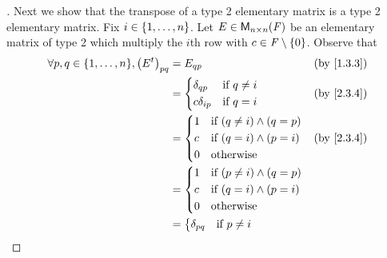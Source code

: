 \begin{proof}[]
  Next we show that the transpose of a type 2 elementary matrix is a type 2 elementary matrix.
  Fix \(i \in \left\lbrace1, \dots, n\right\rbrace\).
  Let \(E \in \mathsf{M}_{{n} \times n}({\mathit{F}})\) be an elementary matrix of type 2 which multiply the \(i\)th row with \(c \in \mathit{F} \setminus \left\lbrace0\right\rbrace\).
  Observe that
  \begin{align*}
    \forall p, q \in \set{1, \dots, n}, \pa{\tp{E}}_{p q} & = E_{q p}                                  &  & \text{(by \cref{1.3.3})} \\
                                                          & = \begin{dcases}
                                                                \delta_{q p}   & \text{if } q \neq i \\
                                                                c \delta_{i p} & \text{if } q = i
                                                              \end{dcases}    &  & \text{(by \cref{2.3.4})}                          \\
                                                          & = \begin{dcases}
                                                                1 & \text{if } (q \neq i) \land (q = p) \\
                                                                c & \text{if } (q = i) \land (p = i)    \\
                                                                0 & \text{otherwise}
                                                              \end{dcases} &  & \text{(by \cref{2.3.4})}                             \\
                                                          & = \begin{dcases}
                                                                1 & \text{if } (p \neq i) \land (q = p) \\
                                                                c & \text{if } (q = i) \land (p = i)    \\
                                                                0 & \text{otherwise}
                                                              \end{dcases}                                \\
                                                          & = \begin{dcases}
                                                                \delta_{p q}   & \text{if } p \neq i \\

\end{dcases}
\end{align*}
\end{proof}
